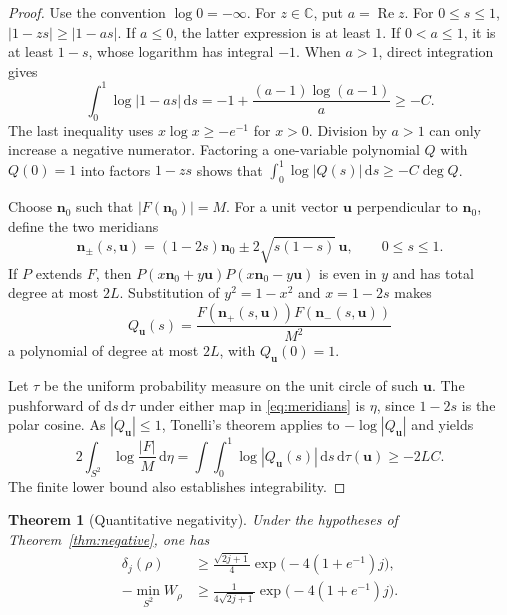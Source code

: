 \documentclass[11pt,a4paper]{article}
\newtheorem{theorem}{Theorem}
\newcommand{\dd}{\,\mathrm{d}}
\newcommand{\vn}{\mathbf n}
\newcommand{\vu}{\mathbf u}
\begin{document}
\begin{proof}
Use the convention \(\log 0=-\infty\). For \(z\in\mathbb C\), put
\(a=\operatorname{Re}z\). For \(0\leq s\leq1\),
\(|1-zs|\geq|1-as|\). If \(a\leq0\), the latter expression is at
least \(1\). If \(0<a\leq1\), it is at least \(1-s\), whose
logarithm has integral \(-1\). When \(a>1\), direct integration gives
\begin{equation}
  \int_0^1\log|1-as|\dd s
  =-1+\frac{(a-1)\log(a-1)}{a}\geq -C .
  \label{eq:linear-log}
\end{equation}
The last inequality uses \(x\log x\geq-e^{-1}\) for \(x>0\).
Division by \(a>1\) can only increase a negative numerator.
Factoring a one-variable polynomial \(Q\) with \(Q(0)=1\) into
factors \(1-zs\) shows that
\(\int_0^1\log|Q(s)|\dd s\geq-C\deg Q\).

Choose \(\vn_0\) such that \(|F(\vn_0)|=M\). For a unit vector
\(\vu\) perpendicular to \(\vn_0\), define the two meridians
\begin{equation}
  \vn_\pm(s,\vu)=(1-2s)\vn_0
                    \pm 2\sqrt{s(1-s)}\,\vu,\qquad 0\leq s\leq1 .
  \label{eq:meridians}
\end{equation}
If \(P\) extends \(F\), then
\(P(x\vn_0+y\vu)P(x\vn_0-y\vu)\) is even in \(y\) and has total
degree at most \(2L\). Substitution of \(y^2=1-x^2\) and
\(x=1-2s\) makes
\[
  Q_{\vu}(s)=\frac{F(\vn_+(s,\vu))F(\vn_-(s,\vu))}{M^2}
\]
a polynomial of degree at most \(2L\), with \(Q_{\vu}(0)=1\).

Let \(\tau\) be the uniform probability measure on the unit circle
of such \(\vu\). The pushforward of \(\mathrm ds\,\mathrm d\tau\)
under either map in \eqref{eq:meridians} is \(\eta\), since \(1-2s\)
is the polar cosine. As \(|Q_\vu|\leq1\), Tonelli's theorem applies
to \(-\log|Q_\vu|\) and yields
\[
  2\int_{S^2}\log\frac{|F|}{M}\dd\eta
  =\int\!\int_0^1\log|Q_{\vu}(s)|\dd s\dd\tau(\vu)
  \geq -2LC .
\]
The finite lower bound also establishes integrability.
\end{proof}

\begin{theorem}[Quantitative negativity]\label{thm:bounds}
Under the hypotheses of Theorem~\ref{thm:negative}, one has
\begin{align}
  \delta_j(\rho)
  &\geq \frac{\sqrt{2j+1}}{4}\exp\bigl(-4(1+e^{-1})j\bigr),
    \label{eq:volume-bound}\\
  -\min_{S^2}W_\rho
  &\geq \frac{1}{4\sqrt{2j+1}}\exp\bigl(-4(1+e^{-1})j\bigr).
    \label{eq:depth-bound}
\end{align}
\end{theorem}
\end{document}
